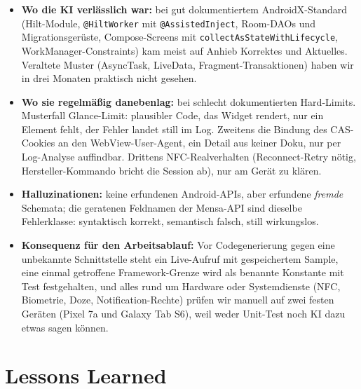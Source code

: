\documentclass{msereport}
\begin{document}
\begin{itemize}
  \item \textbf{Wo die KI verlässlich war:} bei gut dokumentiertem
        AndroidX-Standard (Hilt-Module, \texttt{@HiltWorker} mit
        \texttt{@AssistedInject}, Room-DAOs und Migrationsgerüste,
        Compose-Screens mit \texttt{collectAsStateWithLifecycle},
        WorkManager-Constraints) kam meist auf Anhieb Korrektes und Aktuelles.
        Veraltete Muster (AsyncTask, LiveData, Fragment-Transaktionen) haben wir
        in drei Monaten praktisch nicht gesehen.
  \item \textbf{Wo sie regelmäßig danebenlag:} bei schlecht dokumentierten
        Hard-Limits. Musterfall Glance-Limit: plausibler Code, das Widget
        rendert, nur ein Element fehlt, der Fehler landet still im Log. Zweitens
        die Bindung des CAS-Cookies an den WebView-User-Agent, ein Detail aus
        keiner Doku, nur per Log-Analyse auffindbar. Drittens NFC-Realverhalten
        (Reconnect-Retry nötig, Hersteller-Kommando bricht die Session ab), nur
        am Gerät zu klären.
  \item \textbf{Halluzinationen:} keine erfundenen Android-APIs, aber erfundene
        \emph{fremde} Schemata; die geratenen Feldnamen der Mensa-API sind
        dieselbe Fehlerklasse: syntaktisch korrekt, semantisch falsch, still
        wirkungslos.
  \item \textbf{Konsequenz für den Arbeitsablauf:} Vor Codegenerierung gegen eine
        unbekannte Schnittstelle steht ein Live-Aufruf mit gespeichertem Sample,
        eine einmal getroffene Framework-Grenze wird als benannte Konstante mit
        Test festgehalten, und alles rund um Hardware oder Systemdienste (NFC,
        Biometrie, Doze, Notification-Rechte) prüfen wir manuell auf zwei festen
        Geräten (Pixel 7a und Galaxy Tab S6), weil weder Unit-Test noch KI dazu
        etwas sagen können.
\end{itemize}

\msegap

\section{Lessons Learned}
\end{document}
